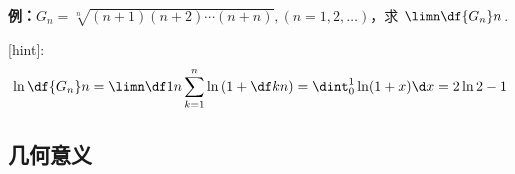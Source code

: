 {\bf 例：}$G_n=\sqrt[n]{(n+1)(n+2)\cdots(n+n)},(n=1,2,\ldots)$，求
$\limn\df{G_n}n$.

{[hint]:}
$$\ln\df{G_n}n=\limn\df1n\sum\limits_{k=1}^n\ln\left(1+\df kn\right)
=\dint_0^1\ln(1+x)\d x=2\ln2-1$$

\subsection{几何意义}

\begin{center}

\end{center}
